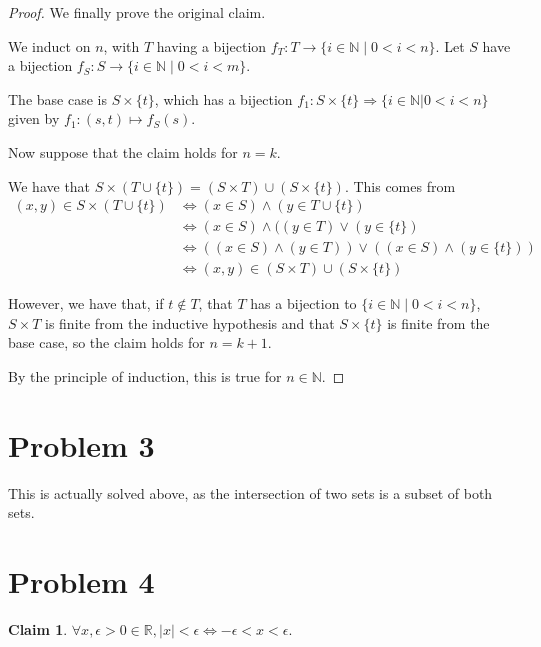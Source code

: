 \documentclass[12pt,letterpaper]{article}
\theoremstyle{definition}
\newtheorem*{claim}{Claim}
\newcommand{\R}{\mathbb{R}}
\newcommand{\N}{\mathbb{N}}
\begin{document}
\begin{proof}
    We finally prove the original claim.

    We induct on $n$, with $T$ having a bijection $f_T: T \rightarrow \{i \in \N \mid 0 < i < n\}$.
    Let $S$ have a bijection $f_S: S \rightarrow \{i \in \N \mid 0 < i < m\}$.

    The base case is $S \times \{t\}$, which has a bijection $f_1: S\times \{t\} \Rightarrow  \{i \in \N | 0 < i < n\}$
    given by $f_1: (s,t) \mapsto f_S(s)$.

    Now suppose that the claim holds for $n = k$.

    We have that $S \times (T \cup \{t\}) = (S \times T) \cup (S \times \{t\})$.
    This comes from 
    \begin{align*}
        (x,y) \in S \times (T \cup \{t\}) &\iff (x \in S) \land (y \in T \cup \{t\}) \\
        &\iff (x \in S) \land ((y \in T) \lor (y \in \{t\}) \\
        &\iff ((x \in S) \land (y \in T)) \lor ((x\in S) \land (y \in \{t\})) \\
        &\iff (x,y) \in (S \times T) \cup (S \times \{t\})
    \end{align*}

    However, we have that, if $t \notin T$, that $T$ has a bijection to $\{i \in \N \mid 0 < i < n\}$, $S \times T$ is finite from the inductive hypothesis and that
    $S \times \{t\}$ is finite from the base case, so the claim holds for $n = k+1$.

    By the principle of induction, this is true for $n \in \N$.
\end{proof}

\section*{Problem 3}

This is actually solved above, as the intersection of two sets is a subset of both sets.

\section*{Problem 4}

\begin{claim}
    $\forall x, \epsilon > 0 \in \R, |x| < \epsilon \iff -\epsilon < x < \epsilon$.
\end{claim}
\end{document}
